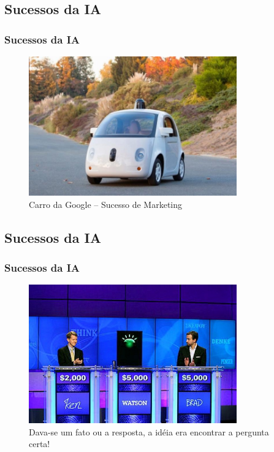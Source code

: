 \documentclass{beamer}
\begin{document}
\subsection{Sucessos da IA}
\begin{frame}
\frametitle{Sucessos da IA}

\begin{figure}[ht!]
 \centering
 \includegraphics[width=0.8\textwidth , height=0.6\textheight]{figures/google-car.jpg}
\caption{Carro da Google -- Sucesso de Marketing}

\end{figure}

\end{frame}
\subsection{Sucessos da IA}
\begin{frame}
\frametitle{Sucessos da IA}

\begin{figure}[ht!]
 \centering
 \includegraphics[width=0.8\textwidth , height=0.6\textheight]{figures/watson-pgm.jpg}
\caption{Dava-se um fato ou a resposta, a idéia era encontrar a pergunta certa!}

\end{figure}

\end{frame}
\end{document}
